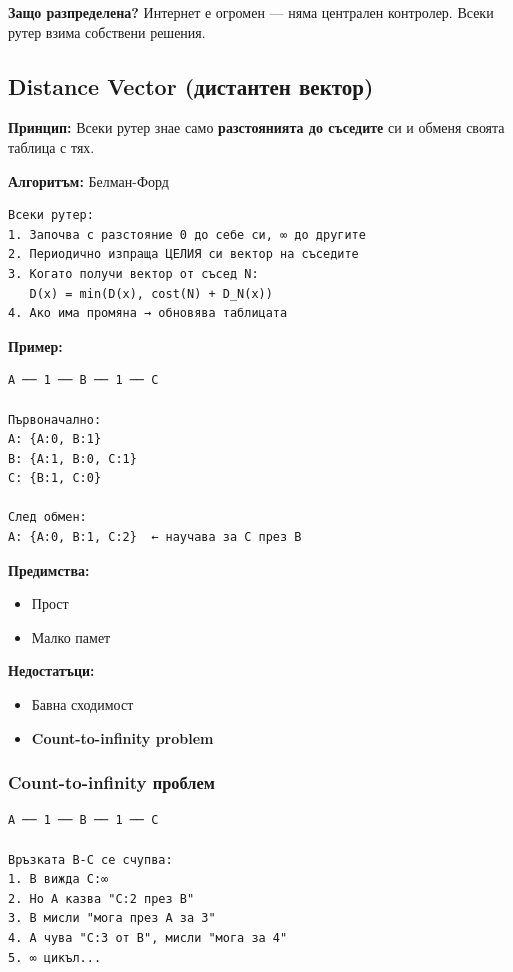 \documentclass[12pt,a4paper]{article}
\begin{document}
\textbf{Защо разпределена?} Интернет е огромен — няма централен контролер. Всеки рутер взима собствени решения.

\subsection{Distance Vector (дистантен вектор)}

\textbf{Принцип:} Всеки рутер знае само \textbf{разстоянията до съседите} си и обменя своята таблица с тях.

\textbf{Алгоритъм:} Белман-Форд

\begin{lstlisting}
Всеки рутер:
1. Започва с разстояние 0 до себе си, ∞ до другите
2. Периодично изпраща ЦЕЛИЯ си вектор на съседите
3. Когато получи вектор от съсед N:
   D(x) = min(D(x), cost(N) + D_N(x))
4. Ако има промяна → обновява таблицата
\end{lstlisting}

\textbf{Пример:}

\begin{lstlisting}
A ── 1 ── B ── 1 ── C

Първоначално:
A: {A:0, B:1}
B: {A:1, B:0, C:1}
C: {B:1, C:0}

След обмен:
A: {A:0, B:1, C:2}  ← научава за C през B
\end{lstlisting}

\textbf{Предимства:}
\begin{itemize}
    \item[$\checkmark$] Прост
    \item[$\checkmark$] Малко памет
\end{itemize}

\textbf{Недостатъци:}
\begin{itemize}
    \item[$\times$] Бавна сходимост
    \item[$\times$] \textbf{Count-to-infinity problem}
\end{itemize}

\subsubsection{Count-to-infinity проблем}

\begin{lstlisting}
A ── 1 ── B ── 1 ── C

Връзката B-C се счупва:
1. B вижда C:∞
2. Но A казва "C:2 през B"
3. B мисли "мога през A за 3"
4. A чува "C:3 от B", мисли "мога за 4"
5. ∞ цикъл...
\end{lstlisting}
\end{document}
